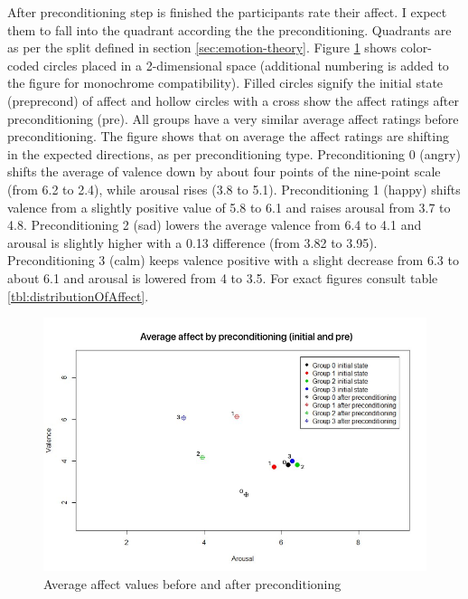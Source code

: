 		After preconditioning step is finished the participants rate their affect. I expect them to fall into the quadrant according the the preconditioning. Quadrants are as per the split defined in section \ref{sec:emotion-theory}. Figure \ref{fig:after-preconditioning-avg} shows color-coded circles placed in a 2-dimensional space (additional numbering is added to the figure for monochrome compatibility). Filled circles signify the initial state (preprecond) of affect and hollow circles with a cross show the affect ratings after preconditioning (pre). All groups have a very similar average affect ratings before preconditioning.
		The figure shows that on average the affect ratings are shifting in the expected directions, as per preconditioning type. 
		Preconditioning 0 (angry) shifts the average of valence down by about four points of the nine-point scale (from 6.2 to 2.4), while arousal rises (3.8 to 5.1). Preconditioning 1 (happy) shifts valence from a slightly positive value of 5.8 to 6.1 and raises arousal from 3.7 to 4.8. 
		Preconditioning 2 (sad) lowers the average valence from 6.4 to 4.1 and arousal is slightly higher with a 0.13 difference (from 3.82 to 3.95).
		Preconditioning 3 (calm) keeps valence positive with a slight decrease from 6.3 to about 6.1 and arousal is lowered from 4 to 3.5. For exact figures consult table \ref{tbl:distributionOfAffect}.
		
\begin{figure}[h!]
	\centering
	\includegraphics[width=1\linewidth]{graphics/after-preconditioning-avg}
	\caption[Avg Affect]{Average affect values before and after preconditioning}
	\label{fig:after-preconditioning-avg}
\end{figure}
		
